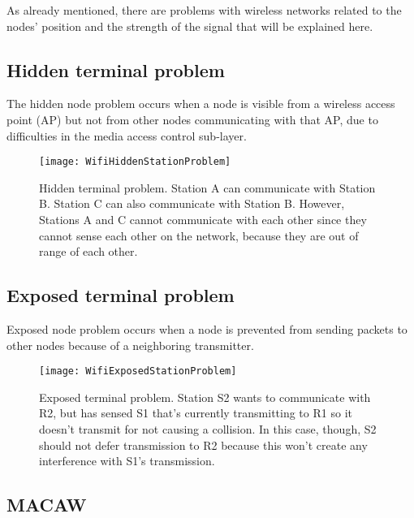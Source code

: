 As already mentioned, there are problems with wireless networks related to the
nodes' position and the strength of the signal that will be explained here.

\subsection{Hidden terminal problem}

The hidden node problem occurs when a node is visible from a wireless access
point (AP) but not from other nodes communicating with that AP, due to
difficulties in the media access control sub-layer.

\begin{figure}[t]
  \centering
  \texttt{[image: WifiHiddenStationProblem]}
  \caption[Hidden terminal problem]{Hidden terminal problem. Station A can
    communicate with Station B. Station C can also communicate with Station B.
    However, Stations A and C cannot communicate with each other since they
    cannot sense each other on the network, because they are out of range of
    each other.}
\end{figure}

\subsection{Exposed terminal problem}

Exposed node problem occurs when a node is prevented from sending packets to
other nodes because of a neighboring transmitter.

\begin{figure}[t]
  \centering
  \texttt{[image: WifiExposedStationProblem]}
  \caption[Exposed terminal problem]{Exposed terminal problem. Station S2
    wants to communicate with R2, but has sensed S1 that's currently
    transmitting to R1 so it doesn't transmit for not causing a collision. In
    this case, though, S2 should not defer transmission to R2 because this won't
    create any interference with S1's transmission.}
\end{figure}

\subsection{MACAW} 

